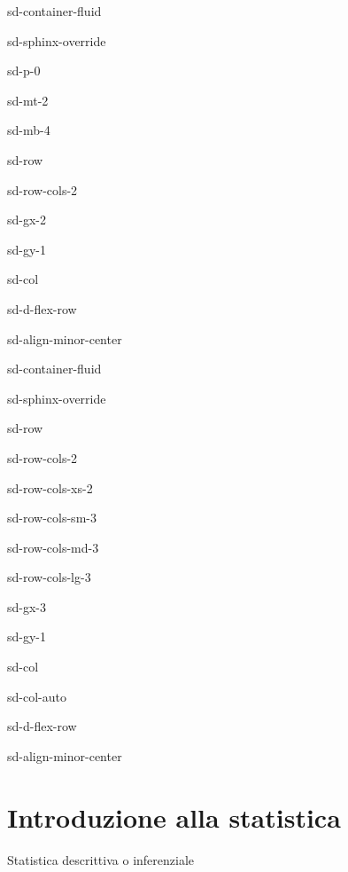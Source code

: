 \documentclass[letterpaper,10pt,italian]{jupyterBook}
\begin{document}
\begin{sphinxuseclass}{sd-container-fluid}
\begin{sphinxuseclass}{sd-sphinx-override}
\begin{sphinxuseclass}{sd-p-0}
\begin{sphinxuseclass}{sd-mt-2}
\begin{sphinxuseclass}{sd-mb-4}
\begin{sphinxuseclass}{sd-row}
\begin{sphinxuseclass}{sd-row-cols-2}
\begin{sphinxuseclass}{sd-gx-2}
\begin{sphinxuseclass}{sd-gy-1}
\begin{sphinxuseclass}{sd-col}
\begin{sphinxuseclass}{sd-d-flex-row}
\begin{sphinxuseclass}{sd-align-minor-center}
\begin{sphinxuseclass}{sd-container-fluid}
\begin{sphinxuseclass}{sd-sphinx-override}
\begin{sphinxuseclass}{sd-row}
\begin{sphinxuseclass}{sd-row-cols-2}
\begin{sphinxuseclass}{sd-row-cols-xs-2}
\begin{sphinxuseclass}{sd-row-cols-sm-3}
\begin{sphinxuseclass}{sd-row-cols-md-3}
\begin{sphinxuseclass}{sd-row-cols-lg-3}
\begin{sphinxuseclass}{sd-gx-3}
\begin{sphinxuseclass}{sd-gy-1}
\begin{sphinxuseclass}{sd-col}
\begin{sphinxuseclass}{sd-col-auto}
\begin{sphinxuseclass}{sd-d-flex-row}
\begin{sphinxuseclass}{sd-align-minor-center}
\end{sphinxuseclass}
\end{sphinxuseclass}
\end{sphinxuseclass}
\end{sphinxuseclass}
\end{sphinxuseclass}
\end{sphinxuseclass}
\end{sphinxuseclass}
\end{sphinxuseclass}
\end{sphinxuseclass}
\end{sphinxuseclass}
\end{sphinxuseclass}
\end{sphinxuseclass}
\end{sphinxuseclass}
\end{sphinxuseclass}
\end{sphinxuseclass}
\end{sphinxuseclass}
\end{sphinxuseclass}
\end{sphinxuseclass}
\end{sphinxuseclass}
\end{sphinxuseclass}
\end{sphinxuseclass}
\end{sphinxuseclass}
\end{sphinxuseclass}
\end{sphinxuseclass}
\end{sphinxuseclass}
\end{sphinxuseclass}

\chapter{Introduzione alla statistica}
\label{\detokenize{ch/statistics:introduzione-alla-statistica}}\label{\detokenize{ch/statistics:math-hs-statistics}}\label{\detokenize{ch/statistics::doc}}
\sphinxAtStartPar
{} Statistica descrittiva o inferenziale
\end{document}
